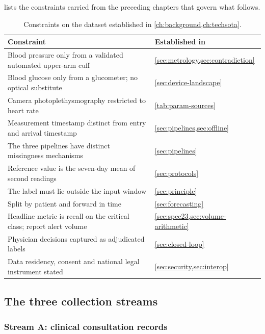 \documentclass[12pt,a4paper,oneside]{report}
\begin{document}
 lists the constraints carried from the preceding chapters that govern what follows.

\begin{table}[htbp]
\centering\footnotesize
\caption{Constraints on the dataset established in \cref{ch:background,ch:techsota}.}\label{tab:carried-constraints}
\begin{tabularx}{\textwidth}{@{}X >{\raggedright\arraybackslash}p{4.4cm}@{}}
\toprule
\textbf{Constraint} & \textbf{Established in} \\
\midrule
Blood pressure only from a validated automated upper-arm cuff & \cref{sec:metrology,sec:contradiction} \\
Blood glucose only from a glucometer; no optical substitute & \cref{sec:device-landscape} \\
Camera photoplethysmography restricted to heart rate & \cref{tab:param-sources} \\
Measurement timestamp distinct from entry and arrival timestamp & \cref{sec:pipelines,sec:offline} \\
The three pipelines have distinct missingness mechanisms & \cref{sec:pipelines} \\
Reference value is the seven-day mean of second readings & \cref{sec:protocols} \\
The label must lie outside the input window & \cref{sec:principle} \\
Split by patient and forward in time & \cref{sec:forecasting} \\
Headline metric is recall on the critical class; report alert volume & \cref{sec:spec23,sec:volume-arithmetic} \\
Physician decisions captured as adjudicated labels & \cref{sec:closed-loop} \\
Data residency, consent and national legal instrument stated & \cref{sec:security,sec:interop} \\
\bottomrule
\end{tabularx}
\end{table}

\subsection{The three collection streams}\label{sec:streams}

\subsubsection{Stream A: clinical consultation records}
\end{document}
